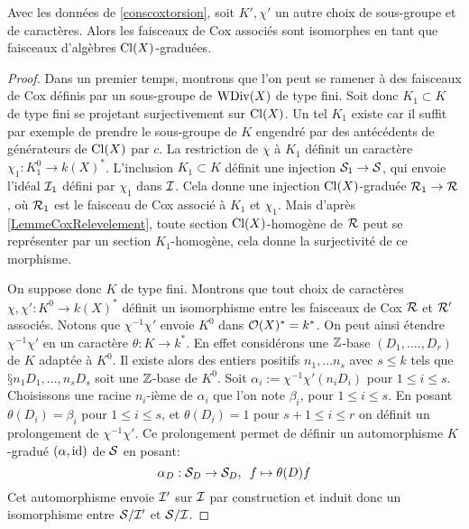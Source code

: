 \begin{thm}\label{InvarianceCoxTorsion}
Avec les données de \ref{conscoxtorsion}, soit $K', \chi'$ un autre choix de sous-groupe et de caractères. Alors les faisceaux de Cox associés sont isomorphes en tant que faisceaux d'algèbres $\operatorname{Cl}(X)$-graduées.
\end{thm}
\begin{proof}
Dans un premier temps, montrons que l'on peut se ramener à des faisceaux de Cox définis par un sous-groupe de $\operatorname{WDiv}(X)$ de type fini. Soit donc $K_1\subset K$ de type fini se projetant surjectivement sur $\operatorname{Cl}(X)$. Un tel $K_1$ existe car il suffit par exemple de prendre le sous-groupe de $K$ engendré par des antécédents de générateurs de $\operatorname{Cl}(X)$ par $c$. La restriction de $\chi$ à $K_1$ définit un caractère $\chi_1:K_1^0\rightarrow k(X)^*$. L'inclusion $K_1\subset K$ définit une injection $\mathcal{S}_1\rightarrow \mathcal{S}$, qui envoie l'idéal $\mathcal{I}_1$ défini par $\chi_1$ dans $\mathcal{I}$. Cela donne une injection $\operatorname{Cl}(X)$-graduée $\mathcal{R}_1\rightarrow \mathcal{R}$, où $\mathcal{R}_1$ est le faisceau de Cox associé à $K_1$ et $\chi_1$. Mais d'après \ref{LemmeCoxRelevelement}, toute section $\operatorname{Cl}(X)$-homogène de $\mathcal{R}$ peut se représenter par un section $K_1$-homogène, cela donne la surjectivité de ce morphisme.

On suppose donc $K$ de type fini. Montrons que tout choix de caractères $\chi,\chi':K^0\rightarrow k(X)^*$ définit un isomorphisme entre les faisceaux de Cox $\mathcal{R}$ et $\mathcal{R}'$ associés. Notons que $\chi^{-1}\chi'$ envoie $K^0$ dans $\mathcal{O}(X)^*=k^*$. On peut ainsi étendre $\chi^{-1}\chi'$ en un caractère $\theta:K\rightarrow k^*$. En effet considérons une $\mathbb{Z}$-base $(D_1,....,D_r)$ de $K$ adaptée à $K^0$. Il existe alors des entiers positifs $n_1,...n_s$ avec $s\leq k$ tels que $§n_1D_1,...,n_sD_s$ soit une $\mathbb{Z}$-base de $K^0$. Soit $\alpha_i := \chi^{-1}\chi'(n_iD_i)$ pour $1\leq i\leq s$. Choisissons une racine $n_i$-ième de $\alpha_i$ que l'on note $\beta_i$, pour $1\leq i\leq s$. En posant $\theta(D_i)=\beta_i$ pour $1\leq i\leq s$, et $\theta(D_i)=1$ pour $s+1\leq i\leq r$ on définit un prolongement de $\chi^{-1}\chi'$. Ce prolongement permet de définir un automorphisme $K$-gradué $(\alpha,\operatorname{id})$ de $\mathcal{S}$ en posant:
$$\alpha_D:\mathcal{S}_D\rightarrow \mathcal{S}_D,\,\,\, f\mapsto \theta(D)f$$
Cet automorphisme envoie $\mathcal{I}'$ sur $\mathcal{I}$ par construction et induit donc un isomorphisme entre $\mathcal{S}/\mathcal{I}'$ et $\mathcal{S}/\mathcal{I}$.


\end{proof}
